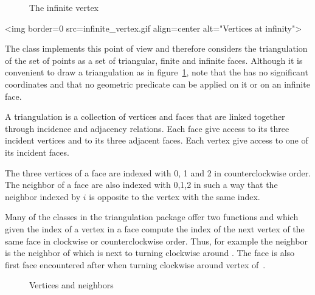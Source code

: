 \begin{ccTexOnly}
\begin{figure}
\begin{center}   \end{center}
\caption{The infinite vertex}
\label{I1_Fig_infinite_vertex}
\end{figure}
\end{ccTexOnly}

\begin{ccHtmlOnly}
<img border=0 src=infinite_vertex.gif align=center alt="Vertices at
infinity">
\end{ccHtmlOnly}



The class 
implements this point of view
and therefore considers  the triangulation of the set of points 
as a set of  triangular,  finite and
infinite faces. 
Although it is convenient to draw a triangulation as in
figure~\ref{I1_Fig_infinite_vertex}, note that
the  has no significant
coordinates and that no geometric predicate can be applied on it
or on an infinite face.

A triangulation is a collection of vertices and faces that
are linked together through incidence and adjacency relations.
 Each face give access to its three incident vertices and to
its 
three adjacent faces. Each vertex give access to one of its  incident
faces. 

The three vertices of a face are indexed with 0, 1 and 2
in counterclockwise order. The neighbor of a face are also 
indexed with 0,1,2 in such a way that the neighbor indexed by $i$
 is opposite to the vertex with the same index.

Many of the classes in the triangulation package
offer  two functions  and 
which given the index of a vertex in a face
compute the index of the next vertex  of the same face
in clockwise
or counterclockwise order.
 Thus, for example the neighbor 
 is
 the
neighbor of   which is next to  turning clockwise
around . The face 
is also first face encountered after  when
turning clockwise around vertex 
of~.



\begin{ccTexOnly}
 \begin{figure}
    \begin{center}
     
    \end{center}
    \caption{Vertices and neighbors}
    \label{I1_Fig_neighbors}
  \end{figure}
\end{ccTexOnly} 

